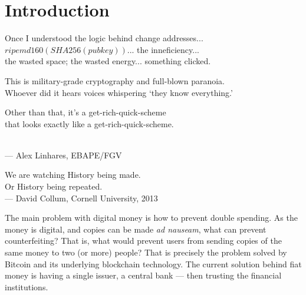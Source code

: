 



\chapter{Introduction}



\bigskip

\begin{flushright}{\slshape
    {Once I understood the logic behind change addresses...\\
    $ripemd160( SHA256( pubkey ) )$... the inneficiency... \\
    the wasted space; the wasted energy... something clicked.\\
    \medskip

    This is military-grade cryptography and full-blown paranoia.\\
    Whoever did it hears voices whispering `they know everything.' \\
    \medskip

    Other than that, it's a get-rich-quick-scheme \\
    that looks exactly like a get-rich-quick-scheme.}
	\\ \medskip
    --- Alex Linhares, EBAPE/FGV

        \bigskip
        \bigskip
        \bigskip
        \bigskip

    {We are watching History being made.\\
    Or History being repeated.}
	\\ \medskip
    --- David Collum, Cornell University, 2013}
\end{flushright}
\bigskip
\bigskip
\bigskip
\bigskip

The main problem with digital money is how to prevent double spending. As the money is digital, and copies can be made \textit{ad nauseam}, what can prevent counterfeiting? That is, what would prevent users from sending copies of the same money to two (or more) people? That is precisely the problem solved by Bitcoin and its underlying blockchain technology. The current solution behind fiat money is having a single issuer, a central bank --- then trusting the financial institutions.

